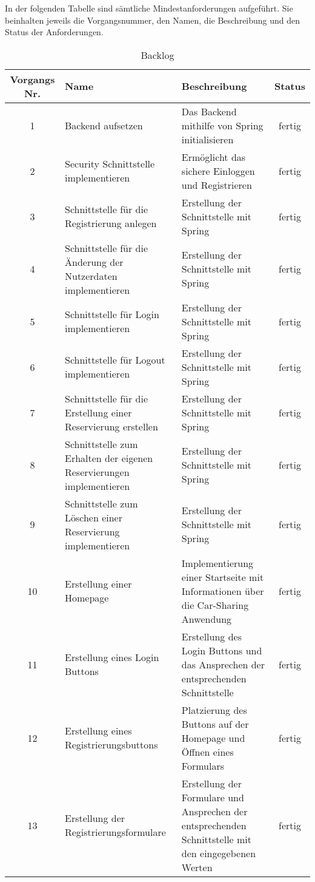 In der folgenden Tabelle sind sämtliche Mindestanforderungen aufgeführt.
Sie beinhalten jeweils die Vorgangsnummer, den Namen, die Beschreibung und den Status der Anforderungen.
\begin{table}[H]
    \caption{Backlog}
    \centering
    \begin{tabularx}{\linewidth}{|c|X|X|c|}
        \hline
        \textbf{Vorgangs Nr.} & \textbf{Name} & \textbf{Beschreibung} & \textbf{Status} \\ \hline
        1 & Backend aufsetzen & Das Backend mithilfe von Spring initialisieren & fertig \\ \hline
        2 & Security Schnittstelle implementieren & Ermöglicht das sichere Einloggen und Registrieren & fertig \\ \hline
        3 & Schnittstelle für die Registrierung anlegen & Erstellung der Schnittstelle mit Spring & fertig \\ \hline
        4 & Schnittstelle für die Änderung der Nutzerdaten implementieren & Erstellung der Schnittstelle mit Spring & fertig \\ \hline
        5 & Schnittstelle für Login implementieren & Erstellung der Schnittstelle mit Spring & fertig \\ \hline
        6 & Schnittstelle für Logout implementieren & Erstellung der Schnittstelle mit Spring & fertig \\ \hline
        7 & Schnittstelle für die Erstellung einer Reservierung erstellen & Erstellung der Schnittstelle mit Spring & fertig \\ \hline
        8 & Schnittstelle zum Erhalten der eigenen Reservierungen implementieren & Erstellung der Schnittstelle mit Spring & fertig \\ \hline
        9 & Schnittstelle zum Löschen einer Reservierung implementieren & Erstellung der Schnittstelle mit Spring & fertig \\ \hline
        10 & Erstellung einer Homepage & Implementierung einer Startseite mit Informationen über die Car-Sharing Anwendung & fertig \\ \hline
        11 & Erstellung eines Login Buttons & Erstellung des Login Buttons und das Ansprechen der entsprechenden Schnittstelle & fertig \\ \hline
        12 & Erstellung eines Registrierungsbuttons & Platzierung des Buttons auf der Homepage und Öffnen eines Formulars & fertig \\ \hline
        13 & Erstellung der Registrierungsformulare & Erstellung der Formulare und Ansprechen der entsprechenden Schnittstelle mit den eingegebenen Werten & fertig \\ \hline
    \end{tabularx}
    \label{tab:backlog}
\end{table}
\newpage